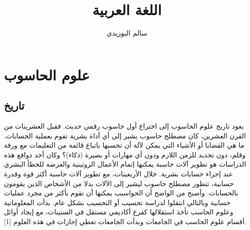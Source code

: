 \documentclass[11pt,a4paper]{report}
\title{
    \Huge\textsc{اللغة العربية}
}
\author{سالم البوزيدي}
\begin{document}
\maketitle
\tableofcontents
\chapter{علوم الحاسوب}
\section{تاريخ}
\begin{otherlanguage}{arabic}
يعود تاريخ علوم الحاسوب إلى اختراع أول حاسوب رقمي حديث. فقبل العشرينات من القرن العشرين، كان مصطلح حاسوب  يشير إلى أي أداة بشرية تقوم بعملية الحسابات. ما هي القضايا أو الأشياء التي يمكن لآلة أن تحسبها باتباع قائمة من التعليمات مع ورقة وقلم، دون تحديد للزمن اللازم ودون أي مهارات أو بصيرة (ذكاء)؟ وكان أحد دوافع هذه الدراسات هو تطوير آلات حاسبة  يمكنها إتمام الأعمال الروتينية والعرضة للخطأ البشري عند إجراء حسابات بشرية.
خلال الأربعينات، مع تطوير آلات حاسبة أكثر قوة وقدرة حسابية، تتطور مصطلح حاسوب ليشير إلى الآلات بدلا من الأشخاص الذين يقومون بالحسابات. وأصبح من الواضح أن الحواسيب يمكنها أن تقوم بأكثر من مجرد عمليات حسابية وبالتالي انتقلوا لدراسة تحسيب أو التحسيب بشكل عام. بدأت المعلوماتية وعلوم الحاسب تأخذ استقلالها كفرع أكاديمي مستقل في الستينات، مع إيجاد أوائل أقسام علوم الحاسب في الجامعات وبدأت الجامعات تعطي إجازات في هذه العلوم [1]. 
\end{otherlanguage}
\end{document}
